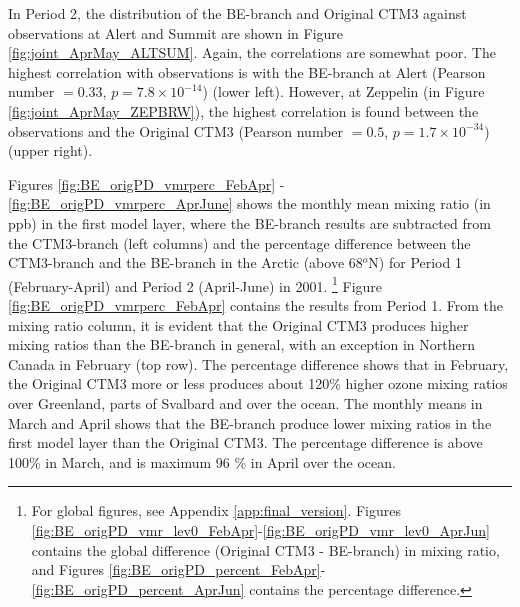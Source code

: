 In Period 2, the distribution of the BE-branch and Original CTM3 against observations at Alert and Summit are shown in Figure \ref{fig:joint_AprMay_ALTSUM}. Again, the correlations are somewhat poor. The highest correlation with observations is with the BE-branch at Alert (Pearson number $=0.33$, $p = 7.8\times10^{-14}$) (lower left). However, at Zeppelin (in Figure \ref{fig:joint_AprMay_ZEPBRW}), the highest correlation is found between the observations and the Original CTM3 (Pearson number $=0.5$, $p = 1.7\times10^{-34}$) (upper right). 












\medskip
\medskip

Figures \ref{fig:BE_origPD_vmrperc_FebApr} - \ref{fig:BE_origPD_vmrperc_AprJune} shows the monthly mean mixing ratio (in ppb) in the first model layer, where the BE-branch results are subtracted from the CTM3-branch (left columns) and the percentage difference between the CTM3-branch and the BE-branch in the Arctic (above 68$^o$N) for Period 1 (February-April) and Period 2 (April-June) in 2001. \footnote{For global figures, see Appendix \ref{app:final_version}. Figures \ref{fig:BE_origPD_vmr_lev0_FebApr}-\ref{fig:BE_origPD_vmr_lev0_AprJun} contains the global difference (Original CTM3 - BE-branch) in mixing ratio, and Figures \ref{fig:BE_origPD_percent_FebApr}-\ref{fig:BE_origPD_percent_AprJun} contains the percentage difference.} Figure \ref{fig:BE_origPD_vmrperc_FebApr} contains the results from Period 1. From the mixing ratio column, it is evident that the Original CTM3 produces higher mixing ratios than the BE-branch in general, with an exception in Northern Canada in February (top row). The percentage difference shows that in February, the Original CTM3 more or less produces about 120\% higher ozone mixing ratios over Greenland, parts of Svalbard and over the ocean. The monthly means in March and April shows that the BE-branch produce lower mixing ratios in the first model layer than the Original CTM3. The percentage difference is above 100\% in March, and is maximum 96 \% in April over the ocean.

